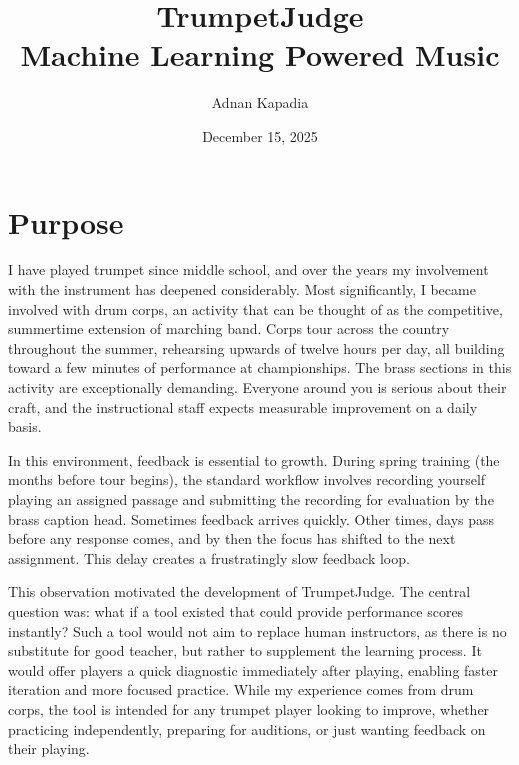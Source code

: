 \documentclass[10pt, a4paper, twocolumn]{article}
\title{\textbf{TrumpetJudge} \\ \normalsize Machine Learning Powered Music}
\author{Adnan Kapadia}
\date{December 15, 2025}
\begin{document}
\twocolumn[
  \begin{@twocolumnfalse}
    \maketitle
    \vspace{-0.5em}
  \end{@twocolumnfalse}
]

\section{Purpose}

I have played trumpet since middle school, and over the years my involvement with the instrument has deepened considerably. Most significantly, I became involved with drum corps, an activity that can be thought of as the competitive, summertime extension of marching band. Corps tour across the country throughout the summer, rehearsing upwards of twelve hours per day, all building toward a few minutes of performance at championships. The brass sections in this activity are exceptionally demanding. Everyone around you is serious about their craft, and the instructional staff expects measurable improvement on a daily basis.

In this environment, feedback is essential to growth. During spring training (the months before tour begins), the standard workflow involves recording yourself playing an assigned passage and submitting the recording for evaluation by the brass caption head. Sometimes feedback arrives quickly. Other times, days pass before any response comes, and by then the focus has shifted to the next assignment. This delay creates a frustratingly slow feedback loop.

This observation motivated the development of TrumpetJudge. The central question was: what if a tool existed that could provide performance scores instantly? Such a tool would not aim to replace human instructors, as there is no substitute for good teacher, but rather to supplement the learning process. It would offer players a quick diagnostic immediately after playing, enabling faster iteration and more focused practice. While my experience comes from drum corps, the tool is intended for any trumpet player looking to improve, whether practicing independently, preparing for auditions, or just wanting feedback on their playing.
\end{document}

